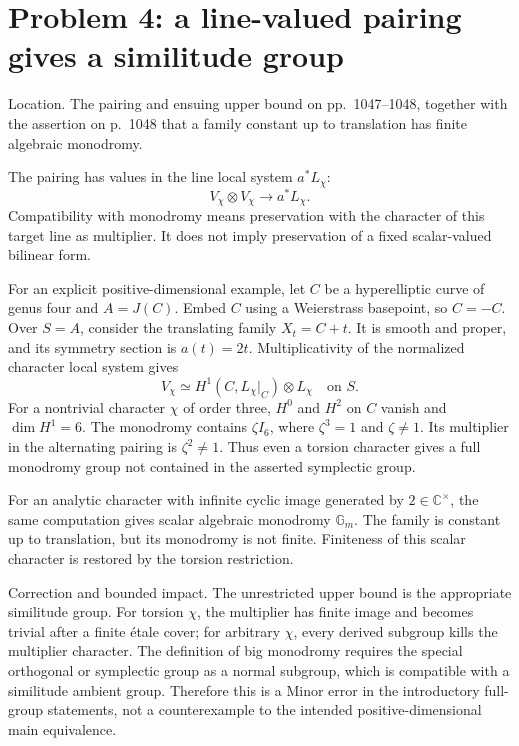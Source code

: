 \documentclass[10pt]{article}
\begin{document}
\section*{Problem 4: a line-valued pairing gives a similitude group}
Location. The pairing and ensuing upper bound on pp. 1047–1048, together with the assertion on p. 1048 that a family constant up to translation has finite algebraic monodromy.\par
The pairing has values in the line local system \(a^*L_\chi\): \[V_\chi\otimes V_\chi\longrightarrow a^*L_\chi.
 \tag{4}\] Compatibility with monodromy means preservation with the character of this target line as multiplier. It does not imply preservation of a fixed scalar-valued bilinear form.\par
For an explicit positive-dimensional example, let \(C\) be a hyperelliptic curve of genus four and \(A=J(C)\). Embed \(C\) using a Weierstrass basepoint, so \(C=-C\). Over \(S=A\), consider the translating family \(X_t=C+t\). It is smooth and proper, and its symmetry section is \(a(t)=2t\). Multiplicativity of the normalized character local system gives \[V_\chi\simeq H^1(C,L_\chi|_C)\otimes L_\chi
 \quad\text{on }S.\] For a nontrivial character \(\chi\) of order three, \(H^0\) and \(H^2\) on \(C\) vanish and \(\dim H^1=6\). The monodromy contains \(\zeta I_6\), where \(\zeta^3=1\) and \(\zeta\ne1\). Its multiplier in the alternating pairing is \(\zeta^2\ne1\). Thus even a torsion character gives a full monodromy group not contained in the asserted symplectic group.\par
For an analytic character with infinite cyclic image generated by \(2\in\mathbb C^\times\), the same computation gives scalar algebraic monodromy \(\mathbb G_m\). The family is constant up to translation, but its monodromy is not finite. Finiteness of this scalar character is restored by the torsion restriction.\par
Correction and bounded impact. The unrestricted upper bound is the appropriate similitude group. For torsion \(\chi\), the multiplier has finite image and becomes trivial after a finite étale cover; for arbitrary \(\chi\), every derived subgroup kills the multiplier character. The definition of big monodromy requires the special orthogonal or symplectic group as a normal subgroup, which is compatible with a similitude ambient group. Therefore this is a Minor error in the introductory full-group statements, not a counterexample to the intended positive-dimensional main equivalence.\par
\end{document}
